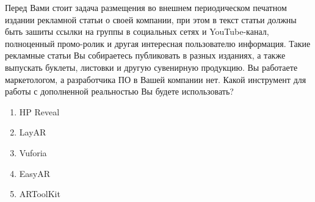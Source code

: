
Перед Вами стоит задача размещения во внешнем периодическом печатном издании рекламной статьи о своей компании, при этом в текст статьи должны быть зашиты ссылки на группы в социальных сетях и YouTube-канал, полноценный промо-ролик и другая интересная пользователю информация. Такие рекламные статьи Вы собираетесь публиковать в разных изданиях, а также выпускать буклеты, листовки и другую сувенирную продукцию. Вы работаете маркетологом, а разработчика ПО в Вашей компании нет. Какой инструмент для работы с дополненной реальностью Вы будете использовать?

\begin{enumerate}
    \item HP Reveal
    \item LayAR
    \item Vuforia
    \item EasyAR
    \item ARToolKit
\end{enumerate}

